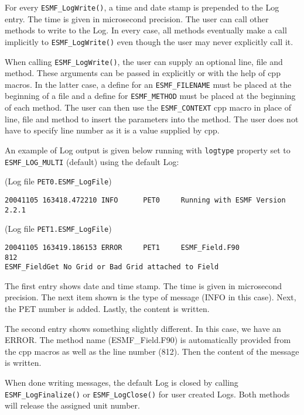 For every {\tt ESMF\_LogWrite()}, a time and date stamp is prepended to the
Log entry.  The time is given in microsecond precision.  The user can call 
other methods to write to the Log.  In every case, all methods eventually make 
a call implicitly to {\tt ESMF\_LogWrite()} even though the user may never 
explicitly call it.

When calling {\tt ESMF\_LogWrite()}, the user can supply an optional line,
file and method.  These arguments can be passed in explicitly or with the help
of cpp macros.  In the latter case, a define for an {\tt ESMF\_FILENAME} must 
be placed at the beginning of a file and a define for {\tt ESMF\_METHOD} must
be placed at the beginning of each method.  The user can then use the
{\tt ESMF\_CONTEXT} cpp macro in place of line, file and method to insert the 
parameters into the method.  The user does not have to specify line number as
it is a value supplied by cpp.

An example of Log output is given below running with {\tt logtype} 
property set to {\tt ESMF\_LOG\_MULTI} (default) using the default Log:

(Log file {\tt PET0.ESMF\_LogFile})
\begin{verbatim}
20041105 163418.472210 INFO      PET0     Running with ESMF Version 2.2.1   
\end{verbatim}

(Log file {\tt PET1.ESMF\_LogFile})
\begin{verbatim}
20041105 163419.186153 ERROR     PET1     ESMF_Field.F90             812  
ESMF_FieldGet No Grid or Bad Grid attached to Field
\end{verbatim}

The first entry shows date and time stamp.  The time is given in microsecond 
precision.  The next item shown is the type of message (INFO in this case).  
Next, the PET number is added.  Lastly, the content is written.

The second entry shows something slightly different.  In this case, we have
an ERROR.  The method name (ESMF\_Field.F90) is automatically provided from 
the cpp macros as well as the line number (812).  Then the content of the 
message is written.
 
When done writing messages, the default Log is closed by calling 
{\tt ESMF\_LogFinalize()}  or {\tt ESMF\_LogClose()} for user created Logs.  
Both methods will release the assigned unit number.
